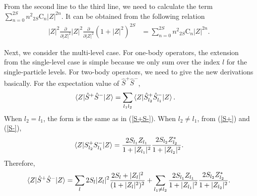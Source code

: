 \documentclass[11pt]{book} %
\begin{document}
From the second line to the third line, we need to calculate the term $\sum_{n=0}^{2S}n^2{}_{2S}\mathrm{C}_n|Z|^{2n}$. It can be obtained from the following relation
\begin{align}
  |Z|^2\frac{\partial}{\partial |Z|^2}|Z|^2\frac{\partial}{\partial |Z|^2}
  (1+|Z|^2)^{2S} &= \sum_{n=0}^{2S}n^2{}_{2S}\mathrm{C}_n|Z|^{2n} .
\end{align}

Next, we consider the multi-level case. For one-body operators, the extension from the single-level case is simple because we only sum over the index $l$ for the single-particle levels. For two-body operators, we need to give the new derivations basically. For the expectation value of $\hat{S}^+\hat{S}^-$,
\begin{align}
  \braket{Z|\hat{S}^+\hat{S}^-|Z} &= \sum_{l_1l_2}\braket{Z|\hat{S}_{l_2}^+\hat{S}_{l_1}^-|Z} .
\end{align}
When $l_2=l_1$, the form is the same as in (\ref{S+S-}). When $l_2\ne l_1$, from (\ref{S+}) and (\ref{S-}),
\begin{align}
  \braket{Z|S_{l_2}^+S_{l_1}^-|Z} = \frac{2S_{l_1}Z_{l_1}}{1+|Z_{l_1}|^2}\frac{2S_{l_2}Z_{l_2}^*}{1+|Z_{l_2}|^2} .
\end{align}
Therefore,
\begin{align}
    \braket{Z|\hat{S}^+\hat{S}^-|Z} = \sum_l 2S_l|Z_l|^2\frac{2S_l+|Z_l|^2}{(1+|Z_l|^2)^2}
    + \sum_{l_1 \neq l_2} \frac{2S_{l_1}Z_{l_1}}{1+|Z_{l_1}|^2}\frac{2S_{l_2}Z_{l_2}^*}{1+|Z_{l_2}|^2} .
\end{align}
\end{document}
